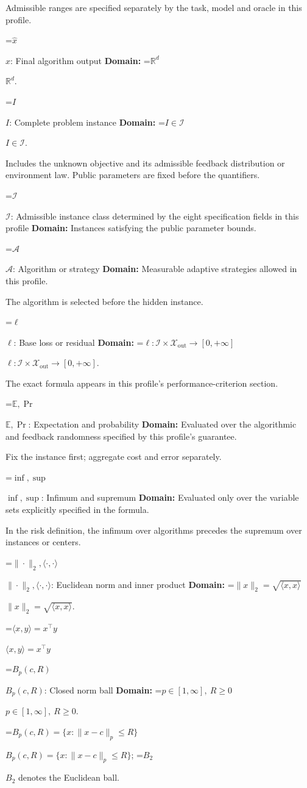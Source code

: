 \documentclass[10pt,a4paper]{article}
\newcommand{\AtlasMath}[1]{\par\begingroup\centering\setbox0=\hbox{$\displaystyle #1$}\ifdim\wd0>1.4\linewidth\typeout{ATLAS WIDE FORMULA: \the\wd0}\fi\ifdim\wd0>\linewidth\resizebox{\linewidth}{!}{\box0}\else\box0\fi\par\endgroup}
\newcommand{\AtlasInlineMath}[1]{\begingroup\setbox0=\hbox{$#1$}\ifdim\wd0>.4\linewidth\endgroup\AtlasMath{#1}\else\endgroup$#1$\fi}
\begin{document}
Admissible ranges are specified separately by the task, model and oracle in this profile.

\AtlasInlineMath{\widehat{x}}: Final algorithm output \textbf{Domain:} \AtlasInlineMath{\mathbb{R}^d}.

\AtlasInlineMath{I}: Complete problem instance \textbf{Domain:} \AtlasInlineMath{I\in\mathcal{I}}.

Includes the unknown objective and its admissible feedback distribution or environment law. Public parameters are fixed before the quantifiers.

\AtlasInlineMath{\mathcal{I}}: Admissible instance class determined by the eight specification fields in this profile \textbf{Domain:} Instances satisfying the public parameter bounds.

\AtlasInlineMath{\mathcal{A}}: Algorithm or strategy \textbf{Domain:} Measurable adaptive strategies allowed in this profile.

The algorithm is selected before the hidden instance.

\AtlasInlineMath{\ell}: Base loss or residual \textbf{Domain:} \AtlasInlineMath{\ell:\mathcal{I}\times\mathcal{X}_{\mathrm{out}}\to[0,+\infty]}.

The exact formula appears in this profile's performance-criterion section.

\AtlasInlineMath{\mathbb{E},\Pr}: Expectation and probability \textbf{Domain:} Evaluated over the algorithmic and feedback randomness specified by this profile's guarantee.

Fix the instance first; aggregate cost and error separately.

\AtlasInlineMath{\inf,\sup}: Infimum and supremum \textbf{Domain:} Evaluated only over the variable sets explicitly specified in the formula.

In the risk definition, the infimum over algorithms precedes the supremum over instances or centers.

\AtlasInlineMath{\|\cdot\|_2,\langle\cdot,\cdot\rangle}: Euclidean norm and inner product \textbf{Domain:} \AtlasInlineMath{\|x\|_2=\sqrt{\langle x,x\rangle}}.

\AtlasInlineMath{\langle x,y\rangle=x^\top y}

\AtlasInlineMath{B_p(c,R)}: Closed norm ball \textbf{Domain:} \AtlasInlineMath{p\in[1,\infty],\ R\ge0}.

\AtlasInlineMath{B_p(c,R)=\{x:\|x-c\|_p\le R\}}; \AtlasInlineMath{B_2} denotes the Euclidean ball.
\end{document}
